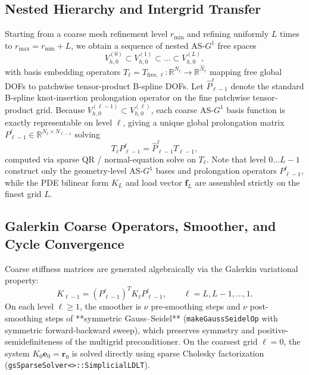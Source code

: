 \documentclass[11pt,a4paper]{article}
\newcommand{\R}{\mathbb{R}}
\begin{document}
\subsection{Nested Hierarchy and Intergrid Transfer}
Starting from a coarse mesh refinement level $r_{\min}$ and refining uniformly $L$ times to $r_{\max} = r_{\min} + L$, we obtain a sequence of nested AS-$G^1$ free spaces
\begin{equation}
V_{h,0}^{(0)} \subset V_{h,0}^{(1)} \subset \dots \subset V_{h,0}^{(L)},
\end{equation}
with basis embedding operators $T_\ell = T_{\mathrm{free},\ell} : \R^{N_\ell} \to \R^{\hat{N}_\ell}$ mapping free global DOFs to patchwise tensor-product B-spline DOFs. Let $\widehat{P}_{\ell-1}^\ell$ denote the standard B-spline knot-insertion prolongation operator on the fine patchwise tensor-product grid. Because $V_{h,0}^{(\ell-1)} \subset V_{h,0}^{(\ell)}$, each coarse AS-$G^1$ basis function is exactly representable on level $\ell$, giving a unique global prolongation matrix $P_{\ell-1}^\ell \in \R^{N_\ell \times N_{\ell-1}}$ solving
\begin{equation}
\label{eq:prolongation}
T_\ell P_{\ell-1}^\ell = \widehat{P}_{\ell-1}^\ell T_{\ell-1},
\end{equation}
computed via sparse QR / normal-equation solve on $T_\ell$. Note that level $0 \dots L-1$ construct only the geometry-level AS-$G^1$ bases and prolongation operators $P_{\ell-1}^\ell$, while the PDE bilinear form $K_L$ and load vector $\mathbf{f}_L$ are assembled strictly on the finest grid $L$.

\subsection{Galerkin Coarse Operators, Smoother, and Cycle Convergence}
Coarse stiffness matrices are generated algebraically via the Galerkin variational property:
\begin{equation}
K_{\ell-1} = (P_{\ell-1}^\ell)^T K_\ell P_{\ell-1}^\ell, \qquad \ell = L, L-1, \dots, 1.
\end{equation}
On each level $\ell \ge 1$, the smoother is $\nu$ pre-smoothing steps and $\nu$ post-smoothing steps of **symmetric Gauss--Seidel** (\texttt{makeGaussSeidelOp} with symmetric forward-backward sweep), which preserves symmetry and positive-semidefiniteness of the multigrid preconditioner. On the coarsest grid $\ell = 0$, the system $K_0 \mathbf{e}_0 = \mathbf{r}_0$ is solved directly using sparse Cholesky factorization (\texttt{gsSparseSolver<>::SimplicialLDLT}).
\end{document}
